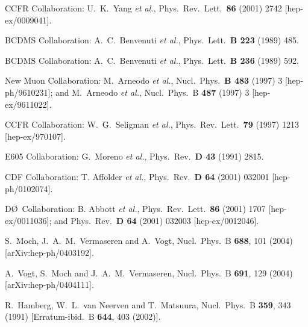 \documentclass[12pt]{iopart}
\begin{document}
\begin{thebibliography}{99}
CCFR Collaboration: U.\ K.\ Yang {\it et al.},
Phys.\ Rev.\ Lett.\ {\bf 86} (2001) 2742 [hep-ex/0009041].

BCDMS Collaboration: A.\ C.\ Benvenuti {\it et al.},
Phys.\ Lett.\ {\bf B 223} (1989) 485.

BCDMS Collaboration: A.\ C.\ Benvenuti {\it et al.},
Phys.\ Lett.\ {\bf B 236} (1989) 592.

New Muon Collaboration: M.\ Arneodo {\it et al.},
Nucl.\ Phys.\ {\bf B 483} (1997) 3 [hep-ph/9610231]; and
M.~Arneodo {\it et al.},
Nucl.\ Phys.\ B {\bf 487} (1997) 3
[hep-ex/9611022].

CCFR Collaboration: W.\ G.\ Seligman {\it et al.},
Phys.\ Rev.\ Lett.\ {\bf 79} (1997) 1213 [hep-ex/970107].

E605 Collaboration: G.\ Moreno {\it et al.},
Phys.\ Rev.\ {\bf D 43} (1991) 2815.


CDF Collaboration: T. Affolder {\it et al.},
Phys.\ Rev.\ {\bf D 64} (2001) 032001 [hep-ph/0102074].


 D\O\ Collaboration: B. Abbott {\it et al.},
Phys.\ Rev.\ Lett.\ {\bf 86} (2001) 1707 [hep-ex/0011036];
and Phys.\ Rev.\ {\bf D 64} (2001) 032003 [hep-ex/0012046].


  S.~Moch, J.~A.~M.~Vermaseren and A.~Vogt,
  Nucl.\ Phys.\ B {\bf 688}, 101 (2004)
  [arXiv:hep-ph/0403192].
  
  A.~Vogt, S.~Moch and J.~A.~M.~Vermaseren,
  Nucl.\ Phys.\ B {\bf 691}, 129 (2004)
  [arXiv:hep-ph/0404111].

  R.~Hamberg, W.~L.~van Neerven and T.~Matsuura,
  Nucl.\ Phys.\ B {\bf 359}, 343 (1991)
  [Erratum-ibid.\ B {\bf 644}, 403 (2002)].
  

\end{thebibliography}
\end{document}
